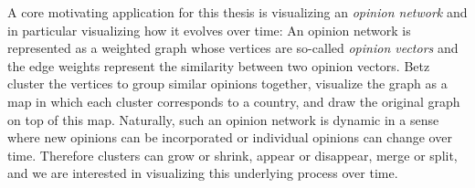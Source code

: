 A core motivating application for this thesis is visualizing an \emph{opinion network} \cite{betz2019applying} and in particular visualizing how it evolves over time: An opinion network is represented as a weighted graph whose vertices are so-called \emph{opinion vectors} and the edge weights represent the similarity between two opinion vectors. Betz \etal{} cluster the vertices to group similar opinions together, visualize the graph as a map in which each cluster corresponds to a country, and draw the original graph on top of this map. Naturally, such an opinion network is dynamic in a sense where new opinions can be incorporated or individual opinions can change over time. Therefore clusters can grow or shrink, appear or disappear, merge or split, and we are interested in visualizing this underlying process over time.

